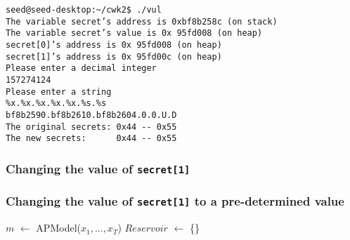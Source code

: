 \documentclass[12pt, a4paper, pdflatex]{article}
\begin{document}
\vspace{1em}
\lstset{
	captionpos=b,
	frame=single,
	language=BASH,
  breaklines=true,
	caption=Example of printing out memory,
	label=printf:crash
}
\begin{lstlisting}
seed@seed-desktop:~/cwk2$ ./vul
The variable secret’s address is 0xbf8b258c (on stack)
The variable secret’s value is 0x 95fd008 (on heap)
secret[0]’s address is 0x 95fd008 (on heap)
secret[1]’s address is 0x 95fd00c (on heap)
Please enter a decimal integer
157274124
Please enter a string
%x.%x.%x.%x.%x.%s.%s   
bf8b2590.bf8b2610.bf8b2604.0.0.U.D
The original secrets: 0x44 -- 0x55
The new secrets:      0x44 -- 0x55
\end{lstlisting}

\subsubsection{Changing the value of \texttt{secret[1]}}

\subsubsection{Changing the value of \texttt{secret[1]} to a pre-determined value}




\SetAlCapSkip{1em}
\LinesNumbered
{}

\vspace{2cm}


\begin{algorithm}[h]

  $m$ $\leftarrow$ APModel($x_1, ..., x_T$)\;
  $Reservoir$ $\leftarrow$ \{\}\;

\end{algorithm}
\vspace{1cm}
\end{document}
